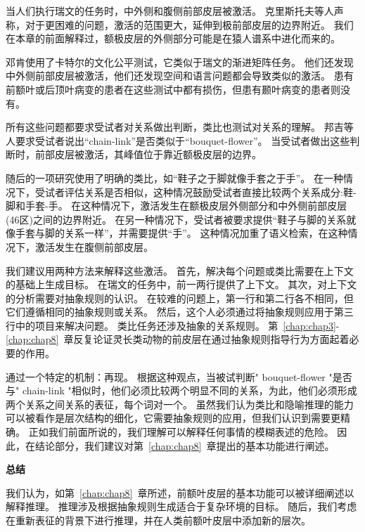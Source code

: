 当人们执行瑞文的任务时，中外侧和腹侧前部皮层被激活\cite{prabhakaran1997neural}。
克里斯托夫等人\cite{christoff2001rostrolateral}声称，对于更困难的问题，激活的范围更大，延伸到极前部皮层的边界附近。
我们在本章的前面解释过，额极皮层的外侧部分可能是在猿人谱系中进化而来的。


邓肯\cite{duncan2000common}使用了卡特尔的文化公平测试\cite{cattell1973technical}，它类似于瑞文的渐进矩阵任务。
他们还发现中外侧前部皮层被激活，他们还发现空间和语言问题都会导致类似的激活。
患有前额叶或后顶叶病变的患者在这些测试中都有损伤，但患有颞叶病变的患者则没有\cite{woolgar2010fluid}。


所有这些问题都要求受试者对关系做出判断，类比也测试对关系的理解。
邦吉等人\cite{bunge2005analogical}要求受试者说出“chain-link”是否类似于“bouquet-flower”。
当受试者做出这些判断时，前部皮层被激活，其峰值位于靠近额极皮层的边界。


随后的一项研究\cite{wendelken2008brain}使用了明确的类比，如“鞋子之于脚就像手套之于手”。
在一种情况下，受试者评估关系是否相似，这种情况鼓励受试者直接比较两个关系成分:鞋-脚和手套-手。
在这种情况下，激活发生在额极皮层外侧部分和中外侧前部皮层(46区)之间的边界附近。
在另一种情况下，受试者被要求提供“鞋子与脚的关系就像手套与脚的关系一样”，并需要提供“手”。
这种情况加重了语义检索，在这种情况下，激活发生在腹侧前部皮层。


我们建议用两种方法来解释这些激活。
首先，解决每个问题或类比需要在上下文的基础上生成目标。
在瑞文的任务中，前一两行提供了上下文。
其次，对上下文的分析需要对抽象规则的认识。
在较难的问题上，第一行和第二行各不相同，但它们遵循相同的抽象规则或关系。
然后，这个人必须通过将抽象规则应用于第三行中的项目来解决问题。
类比任务还涉及抽象的关系规则。
第~\ref{chap:chap3}-\ref{chap:chap8}~章反复论证灵长类动物的前皮层在通过抽象规则指导行为方面起着必要的作用。


通过一个特定的机制：再现。
根据这种观点，当被试判断" bouquet-flower "是否与" chain-link "相似时，他们必须比较两个明显不同的关系，为此，他们必须形成两个关系之间关系的表征，每个词对一个。
虽然我们认为类比和隐喻推理的能力可以被看作是层次结构的细化，它需要抽象规则的应用，但我们认识到需要更精确。
正如我们前面所说的，我们理解可以解释任何事情的模糊表述的危险。
因此，在结论部分，我们建议对第~\ref{chap:chap8}~章提出的基本功能进行阐述。



\textbf{总结}

我们认为，如第~\ref{chap:chap8}~章所述，前额叶皮层的基本功能可以被详细阐述以解释推理。
推理涉及根据抽象规则生成适合于复杂环境的目标。
随后，我们考虑在重新表征的背景下进行推理，并在人类前额叶皮层中添加新的层次。



